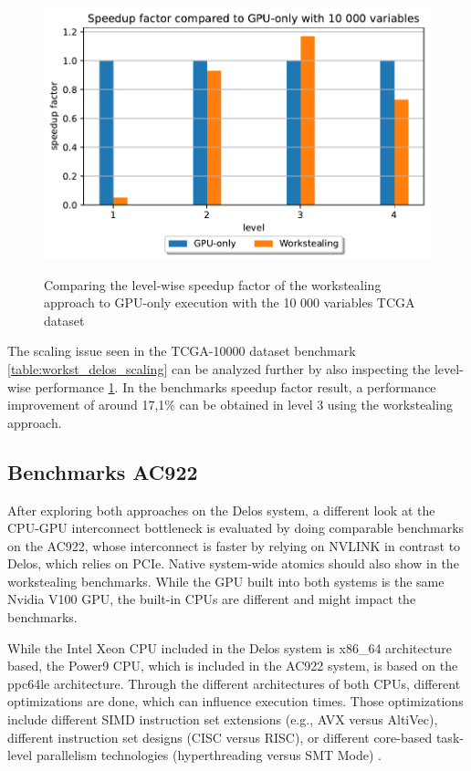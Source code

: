 \begin{figure}[H]
  \caption{Comparing the level-wise speedup factor of the workstealing approach to GPU-only execution with the 10 000 variables TCGA dataset}
  \includegraphics[width=\textwidth]{figures/levelwise_scaled.pdf}
  \centering
  \label{fig:levelwise_scaled_delos}
\end{figure}


The scaling issue seen in the TCGA-10000 dataset benchmark \ref{table:workst_delos_scaling} can be analyzed further by also inspecting the level-wise performance \ref{fig:levelwise_scaled_delos}. In the benchmarks speedup factor result, a performance improvement of around 17,1\% can be obtained in level 3 using the workstealing approach.

\subsection{Benchmarks AC922}
After exploring both approaches on the Delos system, a different look at the CPU-GPU interconnect bottleneck is evaluated by doing comparable benchmarks on the AC922, whose interconnect is faster by relying on NVLINK in contrast to Delos, which relies on PCIe. Native system-wide atomics should also show in the workstealing benchmarks.
While the GPU built into both systems is the same Nvidia V100 GPU, the built-in CPUs are different and might impact the benchmarks.

While the Intel Xeon CPU included in the Delos system is x86\_64 architecture based, the Power9 CPU, which is included in the AC922 system, is based on the ppc64le architecture. Through the different architectures of both CPUs, different optimizations are done, which can influence execution times. Those optimizations include different SIMD instruction set extensions (e.g., AVX versus AltiVec), different instruction set designs (CISC versus RISC), or different core-based task-level parallelism technologies (hyperthreading versus SMT Mode) \cite{AnalysisX86Vs}.

